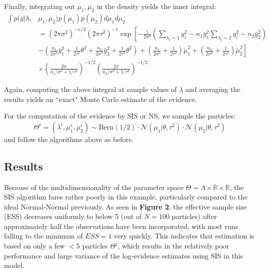 \documentclass[psamsfonts]{amsart}
\newcommand{\N}{\mathcal{N}}
\newcommand{\Bern}{\text{Bern}}
\begin{document}
Finally, integrating out $\mu_1, \mu_2$ in the density yields the inner integral:
\begin{align*}
\int p(y|\lambda, &\mu_1,\mu_2)p(\mu_1)p(\mu_2) d\mu_1 d\mu_2 \\
&= (2\pi\sigma^2)^{-n/2} (2\pi\tau^2)^{-1} \exp\left[ -\frac{1}{2\sigma^2}\left( \sum_{\lambda_i = 1} y_i^2 - n_1\bar{y}_1^2 \sum_{\lambda_i = 2}y_i^2 - n_2\bar{y}_2^2 \right)\right.\\ 
&- \left.\left( \frac{n_1}{2\sigma^2} \bar{y}_1^2 + \frac{1}{2\tau^2}\theta^2 + \frac{n_2}{2\sigma^2} \bar{y}_2^2 + \frac{1}{2\tau^2} \theta^2\right) + \left(\frac{n_1}{2\sigma^2} + \frac{1}{2\tau^2} \right) \tilde{\mu}_1^2 + \left(\frac{n_2}{2\sigma^2} + \frac{1}{2\tau^2}\right)\tilde{\mu}_2^2 \right]\\
&\times \left(\frac{2\pi}{n_1/\sigma^2 + 1/\tau^2}\right)^{-1/2}\left(\frac{2\pi}{n_2/\sigma^2+1/\tau^2}\right)^{-1/2} 
\end{align*}

Again, computing the above integral at sample values of $\lambda$ and averaging the results yields an ``exact" Monte Carlo estimate of the evidence.

For the computation of the evidence by SIS or NS, we sample the particles:
$$\Theta^i = (\lambda^i, \mu_1^i, \mu_2^i) \sim \Bern(1/2)\cdot\N(\mu_1|\theta,\tau^2)\cdot\N(\mu_2|\theta, \tau^2)$$
and follow the algorithms above as before.

\subsection{Results} Because of the multidimensionality of the parameter space $\Theta = \Lambda\times\mathbb{R}\times\mathbb{R}$, the SIS algorithm fares rather poorly in this example, particularly compared to the ideal Normal-Normal previously. As seen in {\bf Figure 2}, the effective sample size (ESS) decreases uniformly to below 5 (out of $N = 100$ particles) after approximately half the observations have been incorporated, with most runs falling to the minimum of $ESS = 1$ very quickly. This indicates that estimation is based on only a few $< 5$ particles $\Theta^i$, which results in the relatively poor performance and large variance of the log-evidence estimates using SIS in this model.
\end{document}
